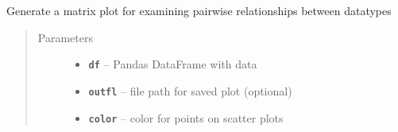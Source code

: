 \documentclass[letterpaper,10pt,english]{sphinxmanual}
\begin{document}
\begin{fulllineitems}
\label{index:pygeos.plot.corr_plot}
Generate a matrix plot for examining pairwise relationships between datatypes
\begin{quote}\begin{description}
\item[{Parameters}] \leavevmode\begin{itemize}
\item {} 
\textbf{\texttt{df}} -- Pandas DataFrame with data

\item {} 
\textbf{\texttt{outfl}} -- file path for saved plot (optional)

\item {} 
\textbf{\texttt{color}} -- color for points on scatter plots

\end{itemize}

\end{description}\end{quote}

\end{fulllineitems}

\end{document}

